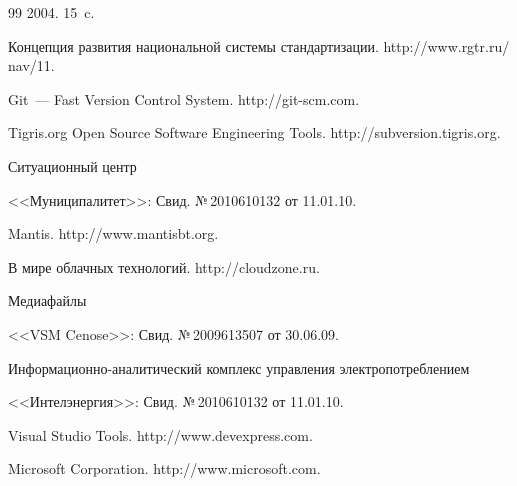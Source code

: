 {{\begin{thebibliography}{99}
2004. 15~c.




Концепция развития национальной сис\-те\-мы стандартизации. {\sf http://www.rgtr.ru/ nav/11}.




Git~--- Fast Version Control System. {\sf http://git-scm.com}.




Tigris.org Open Source Software Engineering Tools. {\sf http://subversion.tigris.org}.




 Ситуационный центр 


<<Муниципалитет>>: Свид. №\,2010610132 от 11.01.10. 




Mantis. {\sf http://www.mantisbt.org}.




В мире облачных технологий. {\sf http://cloudzone.ru}.




 Медиафайлы 


<<VSM Cenose>>: Свид. №\,2009613507 от 30.06.09.






Ин\-фор\-ма\-ци\-он\-но-ана\-ли\-ти\-че\-ский комплекс управ\-ле\-ния электропотреблением 


<<Интел\-энер\-гия>>: Свид. №\,2010610132 от 11.01.10. 




Visual Studio Tools. {\sf http://www.devexpress.com}.




Microsoft Corporation. {\sf http://www.microsoft.com}.


 \end{thebibliography}


} }








\vspace*{12pt}





